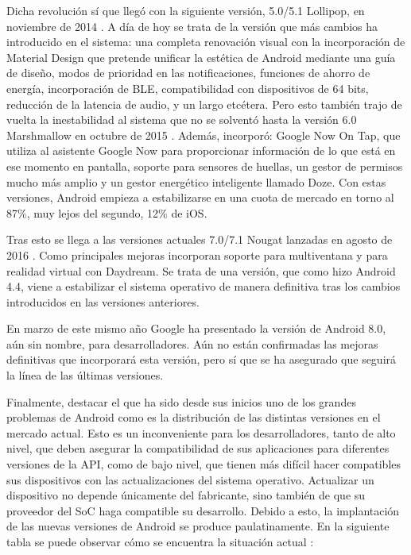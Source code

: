 Dicha revolución sí que llegó con la siguiente versión, 5.0/5.1 Lollipop, en noviembre de 2014 \cite{lollipop}. A día de hoy se trata de la versión que más cambios ha introducido en el sistema: una completa renovación visual con la incorporación de Material Design que pretende unificar la estética de Android mediante una guía de diseño, modos de prioridad en las notificaciones, funciones de ahorro de energía, incorporación de \gls{BLE}, compatibilidad con dispositivos de 64 bits, reducción de la latencia de audio, y un largo etcétera. Pero esto también trajo de vuelta la inestabilidad al sistema que no se solventó hasta la versión 6.0 Marshmallow en octubre de 2015 \cite{marshmallow}. Además, incorporó: Google Now On Tap, que utiliza al asistente Google Now para proporcionar información de lo que está en ese momento en pantalla, soporte para sensores de huellas, un gestor de permisos mucho más amplio y un gestor energético inteligente llamado Doze. Con estas versiones, Android empieza a estabilizarse en una cuota de mercado en torno al 87\%, muy lejos del segundo, 12\% de iOS.

Tras esto se llega a las versiones actuales 7.0/7.1 Nougat lanzadas en agosto de 2016 \cite{nougat}. Como principales mejoras incorporan soporte para multiventana y para realidad virtual con Daydream. Se trata de una versión, que como hizo Android 4.4, viene a estabilizar el sistema operativo de manera definitiva tras los cambios introducidos en las versiones anteriores.

En marzo de este mismo año Google ha presentado la versión de Android 8.0, aún sin nombre, para desarrolladores. Aún no están confirmadas las mejoras definitivas que incorporará esta versión, pero sí que se ha asegurado que seguirá la línea de las últimas versiones.

Finalmente, destacar el que ha sido desde sus inicios uno de los grandes problemas de Android como es la distribución de las distintas versiones en el mercado actual. Esto es un inconveniente para los desarrolladores, tanto de alto nivel, que deben asegurar la compatibilidad de sus aplicaciones para diferentes versiones de la \gls{API}, como de bajo nivel, que tienen más difícil hacer compatibles sus dispositivos con las actualizaciones del sistema operativo. Actualizar un dispositivo no depende únicamente del fabricante, sino también de que su proveedor del \gls{SoC} haga compatible su desarrollo. Debido a esto, la implantación de las nuevas versiones de Android se produce paulatinamente. En la siguiente tabla se puede observar cómo se encuentra la situación actual \cite{distribution}:

